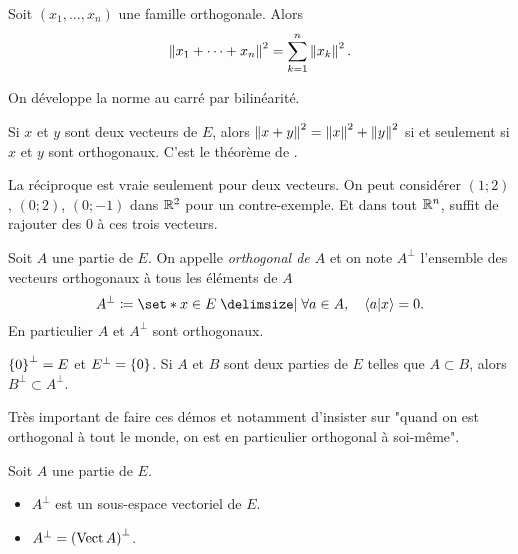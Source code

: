\documentclass{magnolia}
\begin{document}
\begin{proposition}[utile=-3, nom=\nom{Pythagore}]
Soit $(x_1,\ldots,x_n)$ une famille orthogonale. Alors
\[\left\|x_1+\cdots+x_n\right\|^2=\sum_{k=1}^n \left\|x_k\right\|^2.\]
\end{proposition}

\begin{preuve}
On développe la norme au carré par bilinéarité.
\end{preuve}

\begin{remarqueUnique}
\remarque Si $x$ et $y$ sont deux vecteurs de $E$, alors
  $\left\|x+y\right\|^2=\left\|x\right\|^2+\left\|y\right\|^2$ si et seulement si $x$ et $y$ sont
  orthogonaux. C'est le théorème de .
\end{remarqueUnique}

\begin{sol}
La réciproque est vraie seulement pour deux vecteurs. On peut considérer $(1;2)$, $(0;2)$, $(0;-1)$ dans $\mathbb{R}^2$ pour un contre-exemple. Et dans tout $\mathbb{R}^n$, suffit de rajouter des $0$ à ces trois vecteurs.
\end{sol}

\begin{definition}[utile=-3]
Soit $A$ une partie de $E$. On appelle \emph{orthogonal de $A$} et on note $A^{\perp}$
l'ensemble des vecteurs orthogonaux à tous les éléments de $A$
\[A^{\perp}\defeq\enstq{x\in E}{\forall a\in A \qsep \ps{a}{x}=0}.\]  
En particulier $A$ et $A^\perp$ sont orthogonaux.
\end{definition}

\begin{remarques}
\remarque $\left\{0\right\}^\perp=E$ et $E^\perp=\left\{0\right\}$.
\remarque Si $A$ et $B$ sont deux parties de $E$ telles que $A\subset B$, alors
  $B^\perp\subset A^\perp$.
\end{remarques}

\begin{sol}
Très important de faire ces démos et notamment d'insister sur "quand on est orthogonal à tout le monde, on est en particulier orthogonal à soi-même".
\end{sol}

\begin{proposition}[utile=-3]
Soit $A$ une partie de $E$.
\begin{itemize}
\item $A^{\perp}$ est un sous-espace vectoriel de $E$.
\item $A^{\perp}=\left(\operatorname{Vect} A\right)^{\perp}$.
\end{itemize}
\end{proposition}
\end{document}
